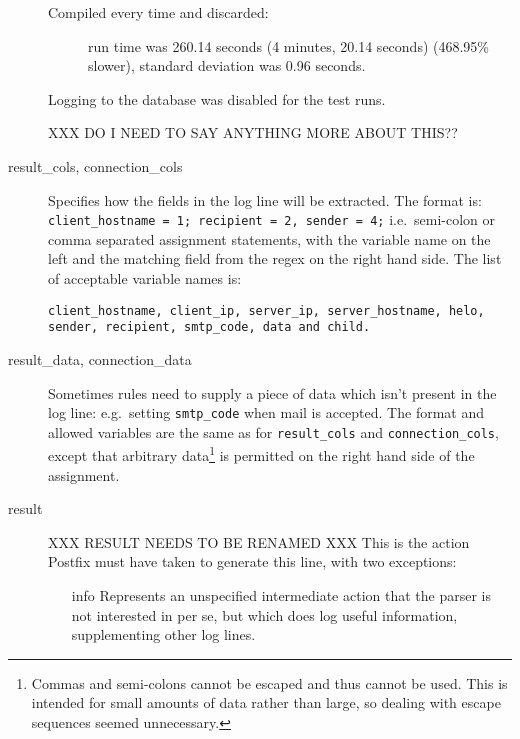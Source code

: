 \documentclass[a4paper,12pt,draft]{article}
\begin{document}
\begin{description}
\begin{description}
            \item [Compiled every time and discarded:] run time was 260.14
                seconds (4 minutes, 20.14 seconds) (468.95\% slower),
                standard deviation was 0.96 seconds.

        \end{description}

        Logging to the database was disabled for the test runs.

        XXX DO I NEED TO SAY ANYTHING MORE ABOUT THIS??

    \item [result\_cols, connection\_cols] Specifies how the fields in the
        log line will be extracted.  The format is: \newline
        \texttt{client\_hostname = 1; recipient = 2, sender = 4;} \newline
        i.e.\ semi-colon or comma separated assignment statements, with the
        variable name on the left and the matching field from the regex on
        the right hand side.  The list of acceptable variable names is:

        \texttt{client\_hostname, client\_ip, server\_ip, server\_hostname,
        \newline helo, sender, recipient, smtp\_code, data and child.}

    \item [result\_data, connection\_data] Sometimes rules need to supply a
        piece of data which isn't present in the log line: e.g.\ setting
        \texttt{smtp\_code} when mail is accepted.  The format and allowed
        variables are the same as for \texttt{result\_cols} and
        \texttt{connection\_cols}, except that arbitrary
        data\footnote{Commas and semi-colons cannot be escaped and thus
        cannot be used.  This is intended for small amounts of data rather
        than large, so dealing with escape sequences seemed unnecessary.}
        is permitted on the right hand side of the assignment.

    \item [result]  XXX RESULT NEEDS TO BE RENAMED XXX This is the action
        Postfix must have taken to generate this line, with two exceptions:

        \begin{itemize}

            \item [info] Represents an unspecified intermediate action that
                the parser is not interested in per se, but which does log
                useful information, supplementing other log lines.


\end{itemize}
\end{description}
\end{document}
